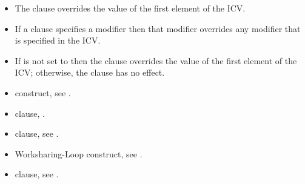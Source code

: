 \linenumbers

\descr
\begin{itemize}
\item The  clause overrides the value of the first element of the
       ICV.
\item If a  clause specifies a modifier then that modifier overrides 
      any modifier that is specified in the  ICV.
\item If  is not set to  then the  clause 
      overrides the value of the first element of the  ICV; otherwise, 
      the  clause has no effect.
\end{itemize}

\crossreferences
\begin{itemize}
\item {} construct, see
.

\item {} clause,
.

\item {} clause, see
.

\item Worksharing-Loop construct, see
.

\item {} clause, see
.
\end{itemize}

